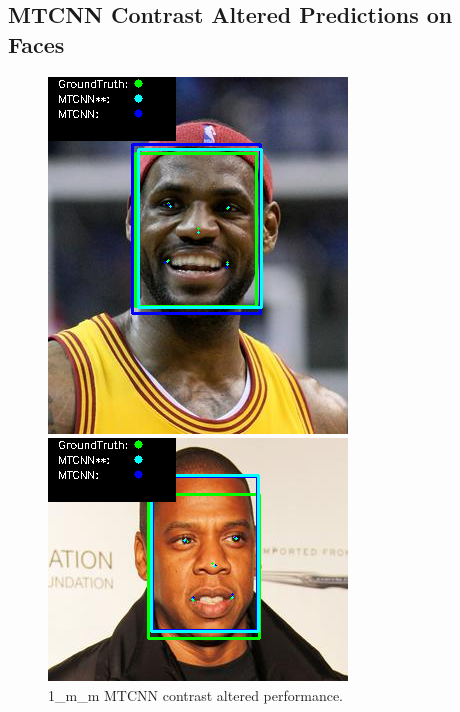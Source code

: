 \documentclass{l4proj}
\begin{document}
\begin{appendices}
\section{MTCNN Contrast Altered Predictions on Faces}
\begin{figure}[h!]
  \centering
  \begin{minipage}{0.49\textwidth}
    \centering
     \includegraphics[width=\textwidth]{images/mtcnn/1.png}
    \caption{1\_m\_m MTCNN contrast altered performance.}
    \label{whoopi_result}
  \end{minipage}
    \hfill
    \begin{minipage}{0.49\textwidth}
    \centering
     \includegraphics[width=\textwidth]{images/mtcnn/4.png}

\end{minipage}
\end{figure}
\end{appendices}
\end{document}
